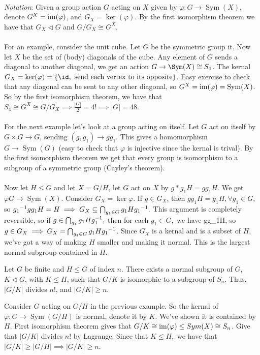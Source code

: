 \documentclass{article}
\newcommand{\nrm}{\triangleleft}
\DeclareMathOperator{\sym}{Sym}
\begin{document}
\begin{itemize}
\\  \textit{Notation}: Given a group action $ G $ acting on $ X $ given by $ \varphi:G\to\sym(X) $, denote $ G^X=\operatorname{im}(\varphi) $, and $ G_X=\ker(\varphi) $. By the first isomorphism theorem we have that $ G_X\nrm G $ and $ G/G_X\cong G^X $.\\\\
For an example, consider the unit cube. Let $ G $ be the symmetric group it. Now let $ X $ be the set of (body) diagonals of the cube. Any element of $ G $ sends a diagonal to another diagonal, we get an action $ G\to\Sym(X)\cong S_4 $. The kernal $ G_X=\ker(\varphi)=\{\id, \text{ send each vertex to its opposite} \} $. Easy exercise to check that any diagonal can be sent to any other diagonal, so $ G^X=\ima (\varphi)=\sym(X) $. So by the first isomorphism theorem, we have that $ S_4\cong G^X\cong G/G_X\implies \frac{|G|}2 = 4!\implies |G|=48 $.\\\\
For the next example let's look at a group acting on itself. Let $ G $ act on itself by $ G\times G\to G $, sending $ (g,g_1)\to gg_1 $. This gives a homomorphism $ G\to \sym(G) $ (easy to check that $ \varphi $ is injective since the kernal is trival). By the first isomorphism theorem we get that every group is isomorphism to a subgroup of a symmetric group (Cayley's theorem).\\\\
Now let $ H\le G $ and let $ X=G/H $, let $ G $ act on $ X $ by $ g*g_1H=gg_1 H $. We get $ \varphi G\to\sym(X) $. Consider $ G_X=\ker \varphi $. If $ g\in G_X $, then $ gg_1H=g_1H, \forall g_1\in G $, so $ {g_1}^{-1}gg_1 H=H\implies G_X\subseteq \bigcap_{g_1\in G} g_1H{g_1}^{-1}.$ This argument is completely reversible, so if $ g\in\bigcap_{g_1}g_1H{g}^{-1}_1, $ then for each $ g_1\in G, $ we have gg_1\in H, so $ g\in G_X\implies G_X=\bigcap_{g_1\in G}g_1H{g_1}^{-1} $. Since $ G_X $ is a kernal and is a subset of $ H $, we've got a way of making $ H $ smaller and making it normal. This is the largest normal subgroup contained in $ H $.
\begin{theorem}
	  Let $ G $ be finite and $ H\le G $ of index $ n $. There exists a normal subgroup of $ G $, $ K\nrm G $, with $ K\le H $, such that $ G/K $ is isomorphic to a subgroup of $ S_n $. Thus, $ |G/K| $ divides $ n! $, and $ |G/K|\ge n$.
\end{theorem}
\pf Consider $ G $ acting on $ G/H $ in the previous example. So the kernal of $ \varphi:G\to\sym(G/H) $ is normal, denote it by $ K $. We've shown it is contained by $ H $. First isomorphism theorem gives that $ G/K\cong \operatorname{im}(\varphi)\le Sym(X)\cong S_n $. Give that $ |G/K| $ divides $ n! $ by Lagrange. Since that $ K\le H, $ we have that $ |G/K|\ge |G/H|\implies |G/K|\ge n $.

\end{itemize}
\end{document}
